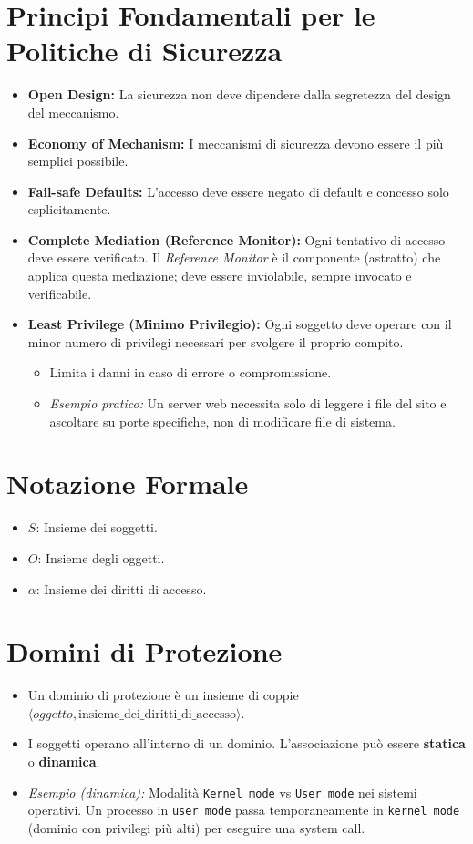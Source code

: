 \section{Principi Fondamentali per le Politiche di Sicurezza}
\begin{itemize}
    \item \textbf{Open Design:} La sicurezza non deve dipendere dalla segretezza del design del meccanismo.
    \item \textbf{Economy of Mechanism:} I meccanismi di sicurezza devono essere il più semplici possibile.
    \item \textbf{Fail-safe Defaults:} L'accesso deve essere negato di default e concesso solo esplicitamente.
    \item \textbf{Complete Mediation (Reference Monitor):} Ogni tentativo di accesso deve essere verificato. Il \textit{Reference Monitor} è il componente (astratto) che applica questa mediazione; deve essere inviolabile, sempre invocato e verificabile.
    \item \textbf{Least Privilege (Minimo Privilegio):} Ogni soggetto deve operare con il minor numero di privilegi necessari per svolgere il proprio compito.
        \begin{itemize}
            \item Limita i danni in caso di errore o compromissione.
            \item \textit{Esempio pratico:} Un server web necessita solo di leggere i file del sito e ascoltare su porte specifiche, non di modificare file di sistema.
        \end{itemize}
\end{itemize}

\section{Notazione Formale}
\begin{itemize}
    \item $S$: Insieme dei soggetti.
    \item $O$: Insieme degli oggetti.
    \item $\alpha$: Insieme dei diritti di accesso.
\end{itemize}

\section{Domini di Protezione}
\begin{itemize}
    \item Un dominio di protezione è un insieme di coppie $\langle oggetto, \text{insieme\_dei\_diritti\_di\_accesso} \rangle$.
    \item I soggetti operano all'interno di un dominio. L'associazione può essere \textbf{statica} o \textbf{dinamica}.
    \item \textit{Esempio (dinamica):} Modalità \texttt{Kernel mode} vs \texttt{User mode} nei sistemi operativi. Un processo in \texttt{user mode} passa temporaneamente in \texttt{kernel mode} (dominio con privilegi più alti) per eseguire una system call.
\end{itemize}

